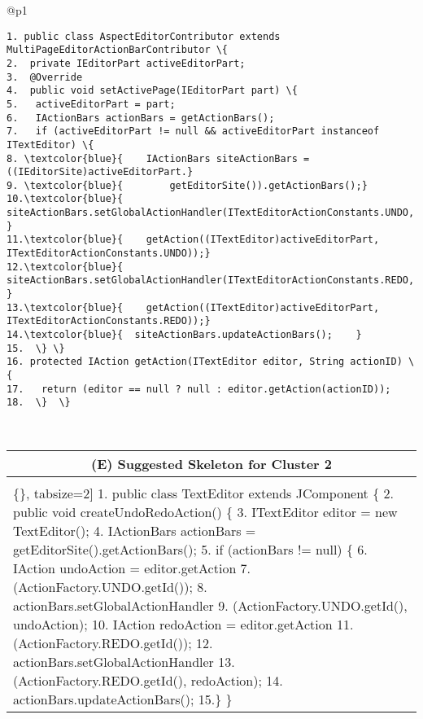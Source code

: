 \begin{figure*}[!htb]
\begin{minipage}{0.5\textwidth}
\begin{tabular}{@{}p{}}
\begin{Verbatim}[commandchars=\\\{\}, tabsize=2]
1. public class AspectEditorContributor extends MultiPageEditorActionBarContributor \{
2.  private IEditorPart activeEditorPart;
3.  @Override
4.  public void setActivePage(IEditorPart part) \{
5.   activeEditorPart = part;
6.   IActionBars actionBars = getActionBars();
7.   if (activeEditorPart != null && activeEditorPart instanceof ITextEditor) \{
8. \textcolor{blue}{    IActionBars siteActionBars = ((IEditorSite)activeEditorPart.}
9. \textcolor{blue}{        getEditorSite()).getActionBars();}
10.\textcolor{blue}{  siteActionBars.setGlobalActionHandler(ITextEditorActionConstants.UNDO, }
11.\textcolor{blue}{    getAction((ITextEditor)activeEditorPart, ITextEditorActionConstants.UNDO));}
12.\textcolor{blue}{  siteActionBars.setGlobalActionHandler(ITextEditorActionConstants.REDO, }
13.\textcolor{blue}{    getAction((ITextEditor)activeEditorPart, ITextEditorActionConstants.REDO));}
14.\textcolor{blue}{  siteActionBars.updateActionBars();    }         
15.  \} \}
16. protected IAction getAction(ITextEditor editor, String actionID) \{
17.   return (editor == null ? null : editor.getAction(actionID));
18.  \}  \}
 \end{Verbatim}
      \vspace{-4mm}
  \\      
\end{tabular} 
\end{minipage}
 \begin{minipage}{0.5\textwidth}
\scriptsize 
\begin{tabular}{@{}p{}} 
 \hline 
  \multicolumn{1}{c}{(E) Suggested Skeleton for Cluster 2} \\ \hline
  \vspace{-4mm}
\begin{Verbatim}[commandchars=\\\{\}, tabsize=2]
1. public class TextEditor extends JComponent \{
2.  public void createUndoRedoAction() \{
3.   ITextEditor editor = new TextEditor();
4.   IActionBars actionBars = getEditorSite().getActionBars();
5.      if (actionBars != null) \{     
6.        IAction undoAction = editor.getAction
7.          (ActionFactory.UNDO.getId());         
8.        actionBars.setGlobalActionHandler
9.          (ActionFactory.UNDO.getId(), undoAction);
10.       IAction redoAction = editor.getAction
11.         (ActionFactory.REDO.getId());
12.       actionBars.setGlobalActionHandler
13.          (ActionFactory.REDO.getId(), redoAction);
14.       actionBars.updateActionBars();
15.\} \}
 \end{Verbatim}
      \vspace{-4mm}

\end{tabular}
\end{minipage}
\end{figure*}

